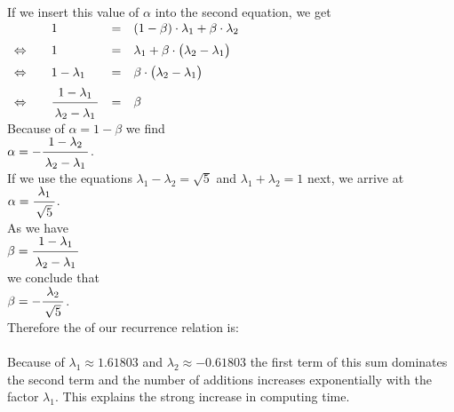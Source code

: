 If we insert this value of $\alpha$  into the second equation, we get 
\\[0.2cm]
\hspace*{1.3cm}
$
\begin{array}{clcl}
                      &  1 & = & (1 - \beta)\cdot  \lambda_1 + \beta \cdot \lambda_2 \\[0.2cm]
\Leftrightarrow\quad  &  1 & = & 
 \lambda_1  + \beta \cdot \bigl( \lambda_2 - \lambda_1\bigr) \\[0.2cm]
\Leftrightarrow\quad  &  1 - \lambda_1 & = & \beta \cdot \bigl(\lambda_2 - \lambda_1\bigr)  \\[0.2cm]
\Leftrightarrow\quad  &  \bruch{1 - \lambda_1}{\lambda_2 - \lambda_1} & = & \beta 
\end{array}
$
\\[0.2cm]
Because of $\alpha = 1 - \beta$ we find  \\[0.2cm]
\hspace*{1.3cm} $\alpha = - \bruch{1 - \lambda_2}{\lambda_2 - \lambda_1}$. \\[0.2cm]
If we use the equations $\lambda_1 - \lambda_2 = \sqrt{5}$ and $\lambda_1 + \lambda_2 = 1$ next, we arrive at
\\[0.2cm]
\hspace*{1.3cm} 
$\alpha = \bruch{\lambda_1}{\sqrt{5}} $.
\\[0.2cm]
As we have
\\[0.2cm]
\hspace*{1.3cm}
$\beta =  \bruch{1 - \lambda_1}{\lambda_2 - \lambda_1}$
\\[0.2cm]
we conclude that
\\[0.2cm]
\hspace*{1.3cm}
$\beta = -\bruch{\lambda_2}{\sqrt{5}}$. 
\\[0.2cm]
Therefore the  of our recurrence relation is: \\[0.2cm]
\hspace*{1.3cm}
  \colorbox{red}{}
\\[0.2cm]
Because of $\lambda_1\approx 1.61803$ and $\lambda_2 \approx - 0.61803$ the first term
of this sum dominates the second term and the number of additions increases exponentially with the factor $\lambda_1$.
This explains the strong increase in computing time.
\vspace*{0.3cm}

